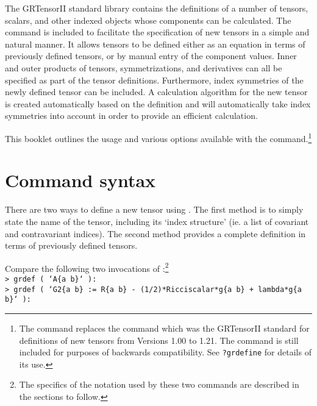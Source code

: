 \documentclass{article}
\begin{document}
\grlabel{\grDefLabel}
\grtitle{\grDefTitle}
\grtitlepage
\copyrightpage
\noindent The GRTensorII standard library contains the definitions of
a number of tensors, scalars, and other indexed objects whose
components can be calculated. The  command is included to
facilitate the specification of new tensors in a simple and natural
manner.  It allows tensors to be defined either as an equation in
terms of previously defined tensors, or by manual entry of the
component values. Inner and outer products of tensors,
symmetrizations, and derivatives can all be specified as part of the
tensor definitions. Furthermore, index symmetries of the newly defined
tensor can be included. A calculation algorithm for the new tensor is
created automatically based on the definition and will automatically
take index symmetries into account in order to provide an efficient
calculation.

This booklet outlines the usage and various options available with the
 command.\footnote{The  command replaces the
 command which was the GRTensorII standard for
definitions of new tensors from Versions 1.00 to 1.21. The
 command is still included for purposes of backwards
compatibility. See \texttt{?grdefine} for details of its use.}
%
\section{Command syntax}
%
There are two ways to define a new tensor using . The
first method is to simply state the name of the tensor, including its
`index structure' (ie. a list of covariant and contravariant
indices). The second method provides a complete definition in terms of
previously defined tensors.

Compare the following two invocations of :\footnote{The
specifics of the notation used by these two commands are described in
the sections to follow.}\\

\noindent\texttt{> grdef ( `A\{a b\}` ):}\\

\noindent\texttt{> grdef ( `G2\{a b\} := R\{a b\} - (1/2)*Ricciscalar*g\{a b\} 
                                   + lambda*g\{a b\}` ):}\\
\end{document}
